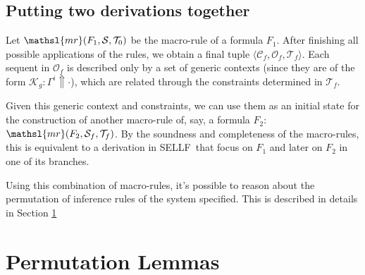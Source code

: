 \documentclass{llncs}
\newcommand\tsl[1]{\hbox{\ensuremath{\mathsl{#1}}}}
\newcommand{\sellf}{\hbox{SELLF}}
\newcommand{\mr}[3]{\tsl{mr}(#1,#2,#3)}
\newcommand{\Oscr}{\mathcal{O}}
\newcommand{\Cscr}{\mathcal{C}}
\newcommand{\Sscr}{\mathcal{S}}
\newcommand{\Tscr}{\mathcal{T}}
\newcommand{\genK}{\mathcal{K}_{g}}
\begin{document}
\begin{comment}
Completeness follows in a similar fashion, but by induction on the height
of derivations. It follows very closely the proof of the soundness lemma.
Notice that in the base case our algorithm a new set of constraints where
$F$ is any one of the subexponential 
contexts.

\begin{lemma}
Let $\Sscr$ be a root sequent context and $F$ a formula. Let $\Xi$ be a
macro-rule obtained in \sellf\ whose end sequent is $\vdash \Sscr
\Downarrow F$. Let $\mr{F}{\Cscr}{\Oscr}{\Tscr}{\Sscr}$ be the macro-rule
constructed using the algorithm above. Then there is a model $M$ of a 
set of constraints in $\Tscr$ that when used to rewrite $\Oscr$ the
resulting open premises are equivalent to those in $\Xi$. 
\end{lemma}

\end{comment}

\subsection{Putting two derivations together}


Let $\mr{F_1}{\Sscr}{\Tscr_0}$ be the macro-rule of a formula $F_1$. After
finishing all possible applications of the rules, we obtain a final tuple
$\langle \Cscr_f, \Oscr_f, \Tscr_f \rangle$. Each sequent in $\Oscr_f$ is described only
by a set of generic contexts (since they are of the form $\genK : \Gamma^i
\Uparrow \cdot$), which are related through the constraints determined in
$\Tscr_f$.

Given this generic context and constraints, we can use them as an initial state
for the construction of another macro-rule of, say, a formula $F_2$:
$\mr{F_2}{\Sscr_f}{\Tscr_f}$. By the soundness and completeness of the
macro-rules, this is equivalent to a derivation in \sellf\ that focus on $F_1$
and later on $F_2$ in one of its branches.

Using this combination of macro-rules, it's possible to reason about the
permutation of inference rules of the system specified. This is described in
details in Section \ref{sec:permutations}

\section{Permutation Lemmas}
\label{sec:permutations}





\end{document}
